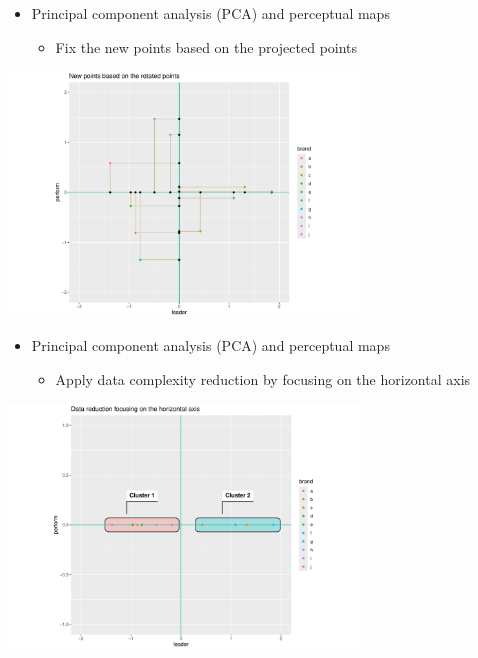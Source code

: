\documentclass[
  ignorenonframetext,
]{beamer}
\providecommand{\tightlist}{%
  \setlength{\itemsep}{0pt}\setlength{\parskip}{0pt}}\usepackage{longtable,booktabs,array}
\begin{document}
\begin{frame}{}
\label{section-20}
\begin{itemize}
\item
  Principal component analysis (PCA) and perceptual maps

  \begin{itemize}
  \tightlist
  \item
    Fix the new points based on the projected points
  \end{itemize}
\end{itemize}

\begin{center}
\includegraphics[width=0.7\textwidth,height=\textheight]{008_reducing_data_complexity_files/figure-beamer/unnamed-chunk-19-1.pdf}
\end{center}
\end{frame}

\begin{frame}{}
\label{section-21}
\begin{itemize}
\item
  Principal component analysis (PCA) and perceptual maps

  \begin{itemize}
  \tightlist
  \item
    Apply data complexity reduction by focusing on the horizontal axis
  \end{itemize}
\end{itemize}

\begin{center}
\includegraphics[width=0.7\textwidth,height=\textheight]{008_reducing_data_complexity_files/figure-beamer/unnamed-chunk-20-1.pdf}
\end{center}
\end{frame}
\end{document}
